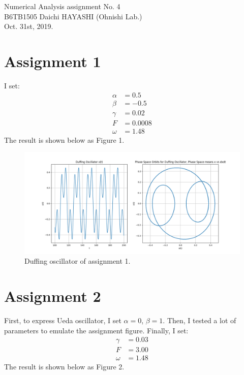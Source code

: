 \documentclass[a4paper,11pt]{article}
\begin{document}
%
\begin{center}
  {\fontsize{16pt}{16pt}\selectfont Numerical Analysis assignment No. 4\\}
  \vspace{16pt}
  \fontsize{10.5pt}{12pt}\selectfont
  B6TB1505 Daichi HAYASHI (Ohnishi Lab.)\\
  \vspace{10.5pt}
  Oct. 31st, 2019.\\
  \vspace{-2mm}
\end{center}

\section{Assignment 1}
I set:
\begin{align*}
    \alpha &= 0.5 \\
    \beta &= -0.5 \\
    \gamma &= 0.02 \\
    F &= 0.0008 \\
    \omega &= 1.48
\end{align*}
The result is shown below as Figure 1.

\begin{figure}[H]
	\centering
	\includegraphics[width=15cm]{1.png}
	\caption{Duffing oscillator of assignment 1.} 
\end{figure}

\section{Assignment 2}
First, to express Ueda oscillator, I set $\alpha = 0$, $\beta = 1$. Then, I tested a lot of parameters to emulate the assignment figure. Finally, I set:
\begin{align*}
    \gamma &= 0.03 \\
    F &= 3.00 \\
    \omega &= 1.48
\end{align*}
The result is shown below as Figure 2.
\end{document}
